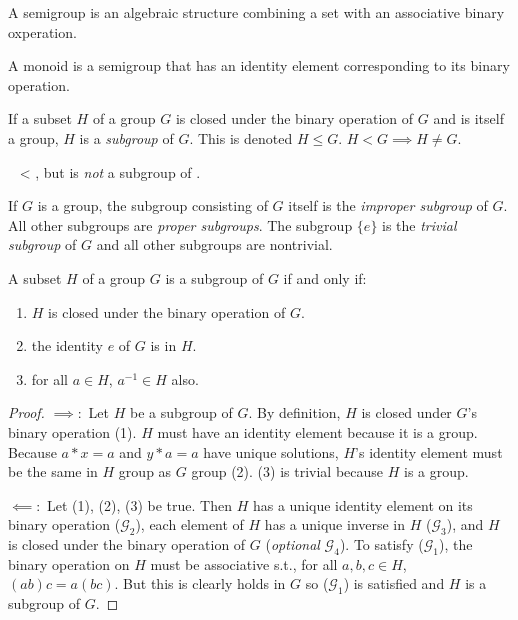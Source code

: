 \begin{definition}[Semigroup]
    A semigroup is an algebraic structure combining a set with an associative binary oxperation.
\end{definition}
\begin{definition}[Monoid]
    A monoid is a semigroup that has an identity element corresponding to its binary operation. 
\end{definition}
\begin{definition}[Subgroup]
    If a subset $H$ of a group $G$ is closed under the binary operation of $G$ and is itself a group, $H$ is a \emph{subgroup} of $G$. This is denoted $H \leq G$. $H < G \implies H \neq G$.
\end{definition}
\begin{example}
    \ \group{\Z}{+} < \group{\R}{+}, but \group{\Q}{\cdot} is \emph{not} a subgroup of \group{\R}{-}.
\end{example}
\begin{definition}
    If $G$ is a group, the subgroup consisting of $G$ itself is the \emph{improper subgroup} of $G$. All other subgroups are \emph{proper subgroups}. The subgroup $\{e\}$ is the \emph{trivial subgroup} of $G$ and all other subgroups are nontrivial.
\end{definition}
\begin{theorem}
    A subset $H$ of a group $G$ is a subgroup of $G$ if and only if:
    \begin{enumerate}
        \item $H$ is closed under the binary operation of $G$.
        \item the identity $e$ of $G$ is in $H$.
        \item for all $a \in H$, $a^{-1} \in H$ also.
    \end{enumerate}
\end{theorem}
\begin{proof}
    $\implies:$ Let $H$ be a subgroup of $G$. By definition, $H$ is closed under $G$'s binary operation (1). $H$ must have an identity element because it is a group. Because $a*x=a$ and $y*a=a$ have unique solutions, $H$'s identity element must be the same in $H$ group as $G$ group (2). (3) is trivial because $H$ is a group.

    $\impliedby:$ Let (1), (2), (3) be true. Then $H$ has a unique identity element on its binary operation ($\mathscr{G}_2$), each element of $H$ has a unique inverse in $H$ ($\mathscr{G}_3$), and $H$ is closed under the binary operation of $G$ (\emph{optional} $\mathscr{G}_4$). To satisfy ($\mathscr{G}_1$), the binary operation on $H$ must be associative s.t., for all $a,b,c \in H$, $(ab)c = a(bc)$. But this is clearly holds in $G$ so ($\mathscr{G}_1$) is satisfied and $H$ is a subgroup of $G$.
\end{proof}
